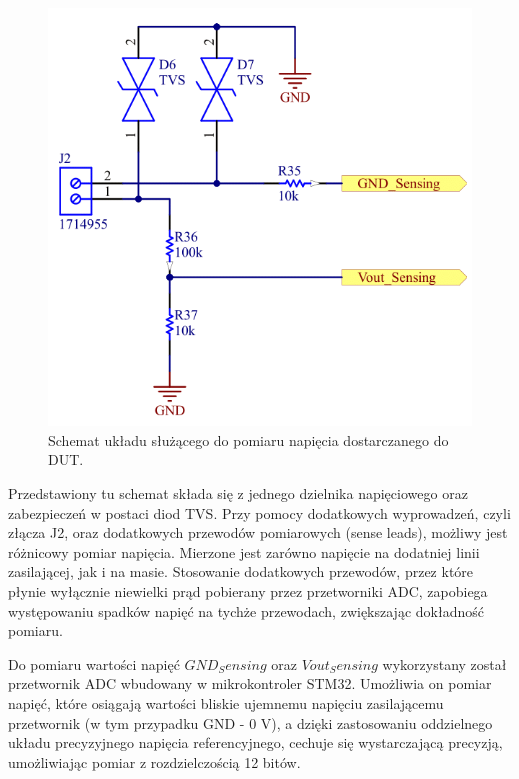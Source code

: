 \begin{figure}[h!]
    \begin{center}
        \includegraphics[width = 13cm]{images/pomiarnapieciaroznicowo_3.png}
        \caption{Schemat układu służącego do pomiaru napięcia dostarczanego do DUT.}
        \label{fig:pomiarnapieciaroznicowo}
    \end{center}
\end{figure}

Przedstawiony tu schemat składa się z jednego dzielnika napięciowego oraz zabezpieczeń w postaci diod TVS.
Przy pomocy dodatkowych wyprowadzeń, czyli złącza J2, oraz dodatkowych przewodów pomiarowych (sense leads), możliwy jest różnicowy pomiar napięcia.
Mierzone jest zarówno napięcie na dodatniej linii zasilającej, jak i na masie. Stosowanie dodatkowych przewodów, przez które płynie wyłącznie niewielki prąd pobierany przez przetworniki ADC,
zapobiega występowaniu spadków napięć na tychże przewodach, zwiększając dokładność pomiaru.

Do pomiaru wartości napięć $GND_Sensing$ oraz $Vout_Sensing$ wykorzystany został
przetwornik ADC wbudowany w mikrokontroler STM32. Umożliwia on pomiar napięć, 
które osiągają wartości bliskie ujemnemu napięciu zasilającemu przetwornik 
(w tym przypadku GND - 0 V), a dzięki zastosowaniu oddzielnego układu precyzyjnego 
napięcia referencyjnego, cechuje się wystarczającą precyzją, umożliwiając pomiar
z rozdzielczością 12 bitów.









